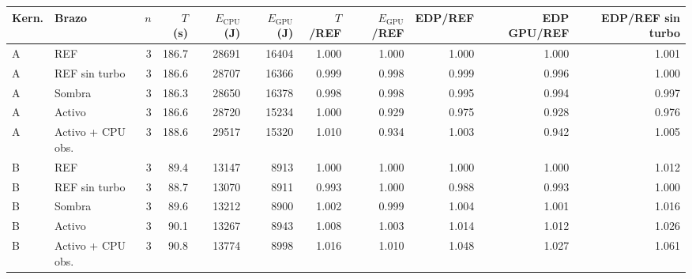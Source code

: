 \begin{tabular}{@{}llrrrrrrrrr@{}}
\toprule
\textbf{Kern.} & \textbf{Brazo} & \textbf{$n$} & \textbf{$T$ (s)} & \textbf{$E_{\mathrm{CPU}}$ (J)} & \textbf{$E_{\mathrm{GPU}}$ (J)} & \textbf{$T$/REF} & \textbf{$E_{\mathrm{GPU}}$/REF} & \textbf{EDP/REF} & \textbf{EDP GPU/REF} & \textbf{EDP/REF sin turbo} \\
\midrule
A & REF & 3 & 186.7 & 28691 & 16404 & 1.000 & 1.000 & 1.000 & 1.000 & 1.001 \\
A & REF sin turbo & 3 & 186.6 & 28707 & 16366 & 0.999 & 0.998 & 0.999 & 0.996 & 1.000 \\
A & Sombra & 3 & 186.3 & 28650 & 16378 & 0.998 & 0.998 & 0.995 & 0.994 & 0.997 \\
A & Activo & 3 & 186.6 & 28720 & 15234 & 1.000 & 0.929 & 0.975 & 0.928 & 0.976 \\
A & Activo + CPU obs. & 3 & 188.6 & 29517 & 15320 & 1.010 & 0.934 & 1.003 & 0.942 & 1.005 \\
\midrule
B & REF & 3 & 89.4 & 13147 & 8913 & 1.000 & 1.000 & 1.000 & 1.000 & 1.012 \\
B & REF sin turbo & 3 & 88.7 & 13070 & 8911 & 0.993 & 1.000 & 0.988 & 0.993 & 1.000 \\
B & Sombra & 3 & 89.6 & 13212 & 8900 & 1.002 & 0.999 & 1.004 & 1.001 & 1.016 \\
B & Activo & 3 & 90.1 & 13267 & 8943 & 1.008 & 1.003 & 1.014 & 1.012 & 1.026 \\
B & Activo + CPU obs. & 3 & 90.8 & 13774 & 8998 & 1.016 & 1.010 & 1.048 & 1.027 & 1.061 \\
\bottomrule
\end{tabular}

